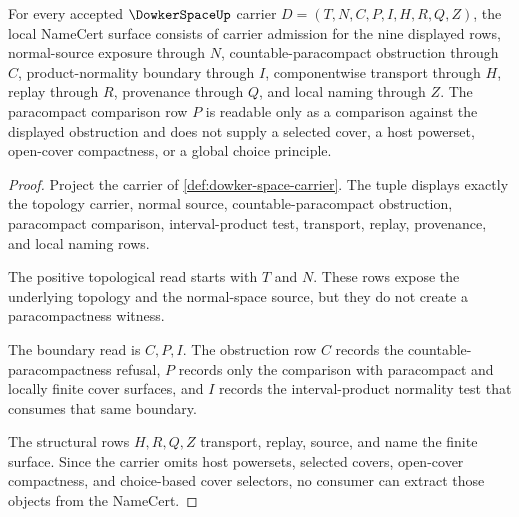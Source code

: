 \begin{theorem}
\label{thm:dowker-space-namecert-obligations}
For every accepted $\DowkerSpaceUp$ carrier $D=(T,N,C,P,I,H,R,Q,Z)$, the local NameCert surface consists of carrier admission for the nine displayed rows, normal-source exposure through $N$, countable-paracompact obstruction through $C$, product-normality boundary through $I$, componentwise transport through $H$, replay through $R$, provenance through $Q$, and local naming through $Z$. The paracompact comparison row $P$ is readable only as a comparison against the displayed obstruction and does not supply a selected cover, a host powerset, open-cover compactness, or a global choice principle.
\end{theorem}
\begin{proof}
Project the carrier of \autoref{def:dowker-space-carrier}. The tuple displays exactly the topology carrier, normal source, countable-paracompact obstruction, paracompact comparison, interval-product test, transport, replay, provenance, and local naming rows.

The positive topological read starts with $T$ and $N$. These rows expose the underlying topology and the normal-space source, but they do not create a paracompactness witness.

The boundary read is $C,P,I$. The obstruction row $C$ records the countable-paracompactness refusal, $P$ records only the comparison with paracompact and locally finite cover surfaces, and $I$ records the interval-product normality test that consumes that same boundary.

The structural rows $H,R,Q,Z$ transport, replay, source, and name the finite surface. Since the carrier omits host powersets, selected covers, open-cover compactness, and choice-based cover selectors, no consumer can extract those objects from the NameCert.
\end{proof}

